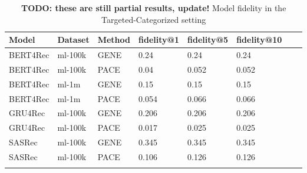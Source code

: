 \begingroup
    \setlength{\tabcolsep}{6pt} %
    \renewcommand{\arraystretch}{1.2} %
    \small %
    \begin{longtable}{|l|l|l|l|l|l|l|l|}
    \hline
\textbf{Model} & \textbf{Dataset} & \textbf{Method} & \textbf{fidelity@1} & \textbf{fidelity@5} & \textbf{fidelity@10} \\ \hline
\endhead
BERT4Rec & ml-100k & GENE & 0.24 & 0.24 & 0.24 \\
BERT4Rec & ml-100k & PACE & 0.04 & 0.052 & 0.052 \\\hline
BERT4Rec & ml-1m & GENE & 0.15 & 0.15 & 0.15 \\
BERT4Rec & ml-1m & PACE & 0.054 & 0.066 & 0.066 \\\hline
GRU4Rec & ml-100k & GENE & 0.206 & 0.206 & 0.206 \\
GRU4Rec & ml-100k & PACE & 0.017 & 0.025 & 0.025 \\\hline
SASRec & ml-100k & GENE & 0.345 & 0.345 & 0.345 \\
SASRec & ml-100k & PACE & 0.106 & 0.126 & 0.126 \\\hline
\caption{\textbf{TODO: these are still partial results, update!} Model fidelity in the Targeted-Categorized setting}
    \label{tab:eval_targ_cat}
    \end{longtable}
    \endgroup